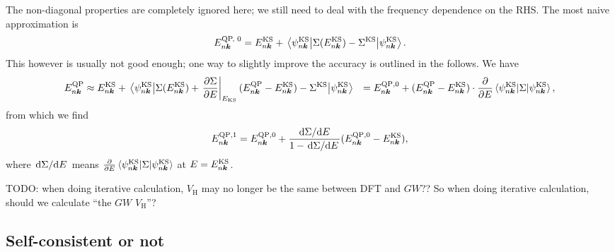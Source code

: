 \documentclass[hyperref, a4paper, 12pt]{report}
\def\\{}%
\begin{document}
The non-diagonal properties are completely ignored here; 
we still need to deal with the frequency dependence on the RHS. 
The most naive approximation is 
\begin{equation}
    E^{\text{QP, 0}}_{n \vb*{k}} = E^{\text{KS}}_{n \vb*{k}} + 
    \mel{\psi^{\text{KS}}_{n \vb*{k}}}{\Sigma (E^{\text{KS}}_{n \vb*{k}}) - \Sigma^{\text{KS}}}{\psi^{\text{KS}}_{n \vb*{k}}}.
\end{equation}
This however is usually not good enough; 
one way to slightly improve the accuracy is outlined in the follows. 
We have 
\[
    \begin{aligned}
        E^{\text{QP}}_{n \vb*{k}} &\approx 
        E^{\text{KS}}_{n \vb*{k}} + 
        \mel{\psi^{\text{KS}}_{n \vb*{k}}}{\Sigma (E^{\text{KS}}_{n \vb*{k}}) + 
        \eval{\pdv{\Sigma}{E}}_{E_{\text{KS}}} (E^{\text{QP}}_{n \vb*{k}} - E^{\text{KS}}_{n \vb*{k}}) 
        - \Sigma^{\text{KS}}}{\psi^{\text{KS}}_{n \vb*{k}}} \\
        &= E^{\text{QP}, 0}_{n \vb*{k}} 
        + (E^{\text{QP}}_{n \vb*{k}} - E^{\text{KS}}_{n \vb*{k}}) 
        \cdot \pdv{E} \expval*{\Sigma}{\psi^{\text{KS}}_{n \vb*{k}}} ,
    \end{aligned}
\]
from which we find 
\begin{equation}
    E^{\text{QP}, 1}_{n \vb*{k}}
    = E^{\text{QP}, 0}_{n \vb*{k}}
    + \frac{
        \dv*{\Sigma}{E}
    }{
        1 - \dv*{\Sigma}{E}
    } (E^{\text{QP}, 0}_{n \vb*{k}} - E^{\text{KS}}_{n \vb*{k}}),
\end{equation}
where $\dv*{\Sigma}{E}$ means $\pdv{E} \expval*{\Sigma}{\psi^{\text{KS}}_{n \vb*{k}}}$
at $E = E^{\text{KS}}_{n \vb*{k}}$.

TODO: when doing iterative calculation, $V_{\text{H}}$ may no longer be the same between DFT and $GW$??
So when doing iterative calculation, should we calculate ``the $GW$ $V_{\text{H}}$''?



\subsection{Self-consistent or not}\label{sec:gw-bse.accuracy.self-consistent}
\end{document}
